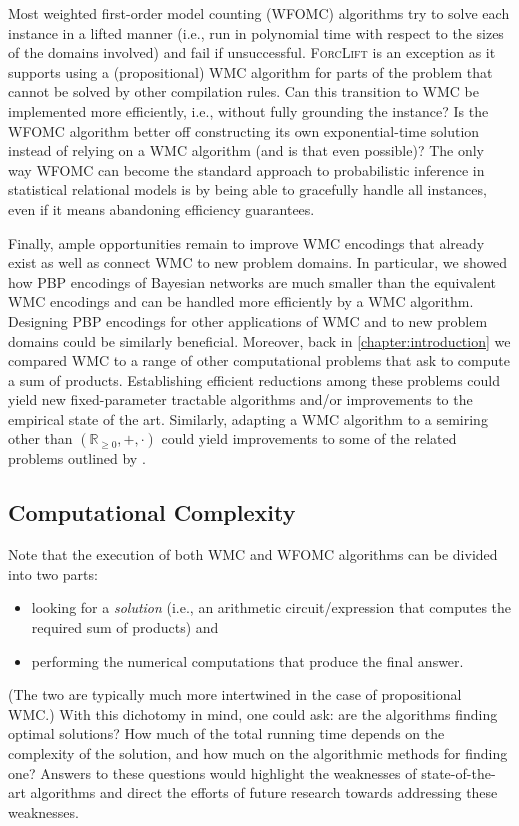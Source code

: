 Most weighted first-order model counting (WFOMC) algorithms try to solve each
instance in a lifted manner (i.e., run in polynomial time with respect to the
sizes of the domains involved) and fail if unsuccessful. \textsc{ForcLift} is an
exception as it supports using a (propositional) WMC algorithm for parts of the
problem that cannot be solved by other compilation rules. Can this transition to
WMC be implemented more efficiently, i.e., without fully grounding the instance?
Is the WFOMC algorithm better off constructing its own exponential-time solution
instead of relying on a WMC algorithm (and is that even possible)? The only way
WFOMC can become the standard approach to probabilistic inference in statistical
relational models is by being able to gracefully handle all instances, even if
it means abandoning efficiency guarantees.

Finally, ample opportunities remain to improve WMC encodings that already exist
as well as connect WMC to new problem domains. In particular, we showed how PBP
encodings of Bayesian networks are much smaller than the equivalent WMC
encodings and can be handled more efficiently by a WMC algorithm. Designing PBP
encodings for other applications of WMC and to new problem domains could be
similarly beneficial. Moreover, back in \cref{chapter:introduction} we compared
WMC to a range of other computational problems that ask to compute a sum of
products. Establishing efficient reductions among these problems could yield new
fixed-parameter tractable algorithms and/or improvements to the empirical state
of the art. Similarly, adapting a WMC algorithm to a semiring other than
$(\mathbb{R}_{\ge 0}, +, \cdot)$ could yield improvements to some of the related
problems outlined by \citet{DBLP:journals/japll/KimmigBR17}.

\subsection{Computational Complexity}

Note that the execution of both WMC and WFOMC algorithms can be divided into two
parts:
\begin{itemize}
  \item looking for a \emph{solution} (i.e., an arithmetic circuit/expression
        that computes the required sum of products) and
  \item performing the numerical computations that produce the final answer.
\end{itemize}
(The two are typically much more intertwined in the case of propositional WMC.)
With this dichotomy in mind, one could ask: are the algorithms finding optimal
solutions? How much of the total running time depends on the complexity of the
solution, and how much on the algorithmic methods for finding one? Answers to
these questions would highlight the weaknesses of state-of-the-art algorithms
and direct the efforts of future research towards addressing these weaknesses.

